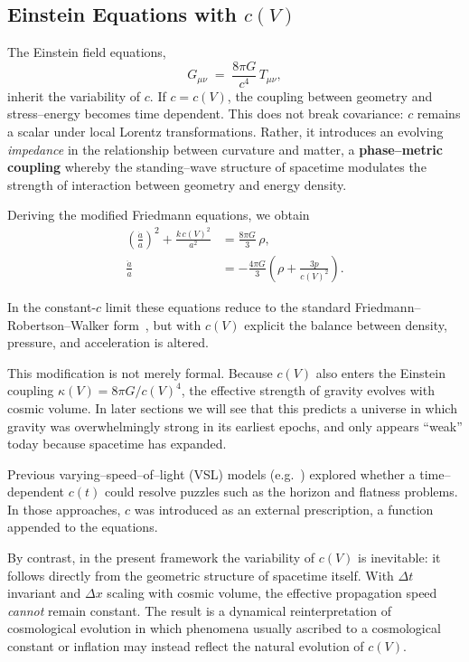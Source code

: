 \documentclass[12pt]{article}
\begin{document}
\subsection{Einstein Equations with \texorpdfstring{$c(V)$}{c(V)}}

The Einstein field equations,
\begin{equation}
  G_{\mu\nu} \;=\; \frac{8\pi G}{c^4}\,T_{\mu\nu},
\end{equation}
inherit the variability of \(c\).  If \(c = c(V)\), the coupling between geometry and stress–energy becomes time dependent.  This does not break covariance: \(c\) remains a scalar under local Lorentz transformations.  Rather, it introduces an evolving \emph{impedance} in the relationship between curvature and matter, a \textbf{phase–metric coupling} whereby the standing–wave structure of spacetime modulates the strength of interaction between geometry and energy density.

Deriving the modified Friedmann equations, we obtain
\begin{align}
  \left(\frac{\dot{a}}{a}\right)^2 + \frac{k\, c(V)^2}{a^2} &= \frac{8 \pi G}{3}\,\rho, \\
  \frac{\ddot{a}}{a} &= -\frac{4 \pi G}{3}\!\left( \rho + \frac{3p}{c(V)^2} \right).
\end{align}

In the constant-$c$ limit these equations reduce to the standard Friedmann–Robertson–Walker form~\cite{frw}, but with $c(V)$ explicit the balance between density, pressure, and acceleration is altered.  

This modification is not merely formal. Because $c(V)$ also enters the Einstein coupling $\kappa(V) = 8\pi G / c(V)^4$, the effective strength of gravity evolves with cosmic volume. In later sections we will see that this predicts a universe in which gravity was overwhelmingly strong in its earliest epochs, and only appears ``weak'' today because spacetime has expanded.

Previous varying–speed–of–light (VSL) models (e.g.\ \cite{albrecht1999,barrow1999,magueijo2003}) explored whether a time– dependent \(c(t)\) could resolve puzzles such as the horizon and flatness problems.  In those approaches, \(c\) was introduced as an external prescription, a function appended to the equations.

By contrast, in the present framework the variability of \(c(V)\) is inevitable: it follows directly from the geometric structure of spacetime itself.  With \(\Delta t\) invariant and \(\Delta x\) scaling with cosmic volume, the effective propagation speed \emph{cannot} remain constant.  The result is a dynamical reinterpretation of cosmological evolution in which phenomena usually ascribed to a cosmological constant or inflation may instead reflect the natural evolution of \(c(V)\).
\end{document}
